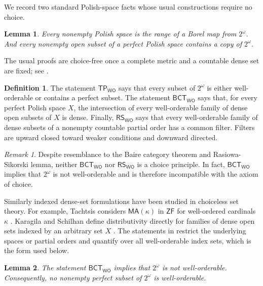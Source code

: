 \documentclass[11pt,reqno]{amsart}
\newcommand{\WO}{\mathsf{WO}}
\newcommand{\BCTWO}{\mathsf{BCT}_{\WO}}
\newcommand{\RSWO}{\mathsf{RS}_{\WO}}
\newcommand{\TP}{\mathsf{TP}_{\WO}}
\theoremstyle{plain}
\newtheorem{lemma}[lemma]{Lemma}
\theoremstyle{definition}
\newtheorem{definition}[definition]{Definition}
\theoremstyle{remark}
\newtheorem{remark}[remark]{Remark}
\begin{document}
We record two standard Polish-space facts whose usual constructions require no choice.

\begin{lemma}\label{lem:polish-coding}
Every nonempty Polish space is the range of a Borel map from $2^\omega$. And every nonempty open subset of a perfect Polish space contains a copy of $2^\omega$.
\end{lemma}

The usual proofs are choice-free once a complete metric and a countable dense set are fixed; see \cite{Kechris1995}.

\begin{definition}\label{def:principles}
The statement $\TP$ says that every subset of $2^\omega$ is either
well-orderable or contains a perfect subset.  The statement $\BCTWO$ says
that, for every perfect Polish space $X$, the intersection of every
well-orderable family of dense open subsets of $X$ is dense.  Finally,
$\RSWO$ says that every well-orderable family of dense subsets of a nonempty
countable partial order has a common filter.  Filters are upward closed toward
weaker conditions and downward directed.
\end{definition}

\begin{remark}\label{rem:choice-catalogue}
Despite resemblance to the Baire category theorem and Rasiowa-Sikorski lemma, neither $\BCTWO$ nor $\RSWO$ is a choice principle. In fact, $\BCTWO$ implies that $2^\omega$ is not well-orderable and is therefore incompatible with the axiom of choice.

Similarly indexed dense-set formulations have been studied in choiceless set theory. For example, Tachtsis considers $\mathsf{MA}(\kappa)$ in $\mathsf{ZF}$ for well-ordered cardinals $\kappa$ \cite{Tachtsis2016}.  Karagila and Schilhan define distributivity directly for families of dense open sets indexed by an arbitrary set $X$ \cite[Definition 3.1]{KaragilaSchilhan2023}.  The statements
in  restrict the underlying spaces or partial orders and quantify over all well-orderable index sets, which is the form used below.
\end{remark}

\begin{lemma}\label{lem:continuum-not-wo}
The statement $\BCTWO$ implies that $2^\omega$ is not well-orderable.
Consequently, no nonempty perfect subset of $2^\omega$ is well-orderable.
\end{lemma}
\end{document}
